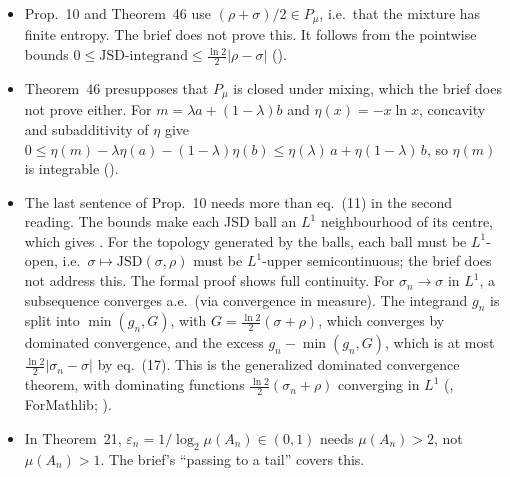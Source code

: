 \documentclass[11pt]{article}
\begin{document}
\begin{itemize}
\item Prop.~10 and Theorem~46 use $(\rho+\sigma)/2 \in P_\mu$, i.e.\ that the mixture has finite
  entropy. The brief does not prove this. It follows from the pointwise bounds
  $0 \le \mathrm{JSD}\text{-integrand} \le \tfrac{\ln 2}{2}|\rho-\sigma|$
  ().
\item Theorem~46 presupposes that $P_\mu$ is closed under mixing, which the brief does not
  prove either. For $m = \lambda a + (1-\lambda) b$ and $\eta(x) = -x\ln x$, concavity and
  subadditivity of $\eta$ give
  $0 \le \eta(m) - \lambda\eta(a) - (1-\lambda)\eta(b) \le \eta(\lambda)\,a + \eta(1-\lambda)\,b$,
  so $\eta(m)$ is integrable ().
\item The last sentence of Prop.~10 needs more than eq.~(11) in the second reading. The bounds
  make each JSD ball an $L^1$ neighbourhood of its centre, which gives
  . For the topology generated by the balls, each ball must be $L^1$-open,
  i.e.\ $\sigma \mapsto \mathrm{JSD}(\sigma, \rho)$ must be $L^1$-upper semicontinuous; the
  brief does not address this. The formal proof shows full continuity. For
  $\sigma_n \to \sigma$ in $L^1$, a subsequence converges a.e.\ (via convergence in measure).
  The integrand $g_n$ is split into $\min(g_n, G)$, with $G = \tfrac{\ln 2}{2}(\sigma + \rho)$,
  which converges by dominated convergence, and the excess $g_n - \min(g_n, G)$, which is at
  most $\tfrac{\ln 2}{2}|\sigma_n - \sigma|$ by eq.~(17). This is the generalized dominated
  convergence theorem, with dominating functions $\tfrac{\ln 2}{2}(\sigma_n + \rho)$ converging
  in $L^1$ (, ForMathlib;
  ).
\item In Theorem~21, $\varepsilon_n = 1/\log_2\mu(A_n) \in (0, 1)$ needs $\mu(A_n) > 2$, not
  $\mu(A_n) > 1$. The brief's ``passing to a tail'' covers this.
\end{itemize}
\end{document}
